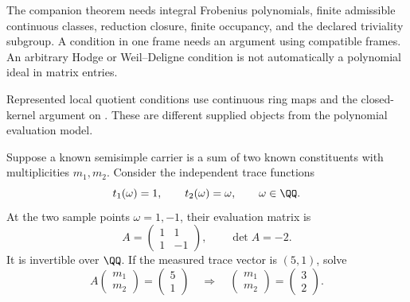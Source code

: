 
The companion theorem needs integral Frobenius polynomials, finite admissible continuous classes, reduction closure, finite occupancy, and the declared triviality subgroup. A condition in one frame needs an argument using compatible frames. An arbitrary Hodge or Weil--Deligne condition is not automatically a polynomial ideal in matrix entries.

Represented local quotient conditions use continuous ring maps and the closed-kernel argument on . These are different supplied objects from the polynomial evaluation model.


Suppose a known semisimple carrier is a sum of two known constituents with multiplicities $m_1,m_2$. Consider the independent trace functions
\[
t_1(\omega)=1,\qquad t_2(\omega)=\omega,\qquad \omega\in\QQ.
\]
At the two sample points $\omega=1,-1$, their evaluation matrix is
\[
A=\begin{pmatrix}1&1\\1&-1\end{pmatrix},\qquad\det A=-2.
\]
It is invertible over $\QQ$. If the measured trace vector is $(5,1)$, solve
\[
A\begin{pmatrix}m_1\\m_2\end{pmatrix}=\begin{pmatrix}5\\1\end{pmatrix}
\quad\Longrightarrow\quad
\begin{pmatrix}m_1\\m_2\end{pmatrix}=\begin{pmatrix}3\\2\end{pmatrix}.
\]

